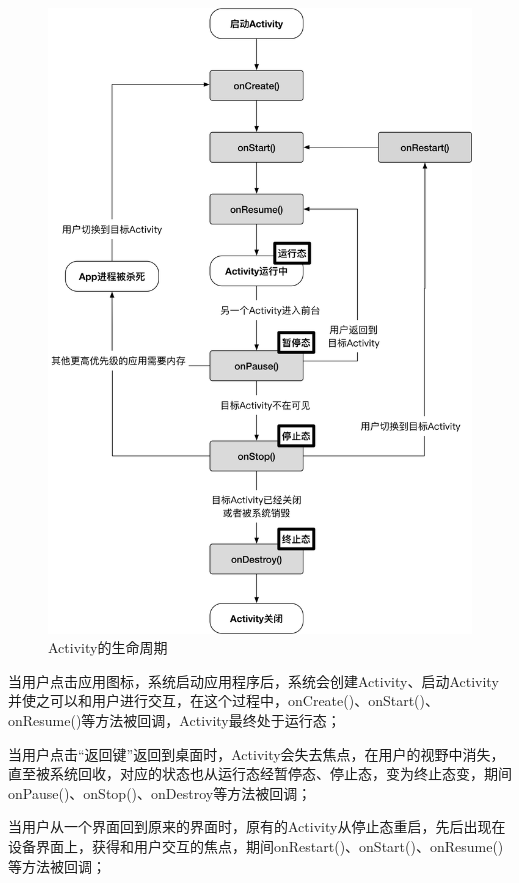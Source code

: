  
\begin{figure}
	\centering
	\includegraphics[width=\textwidth]{./Figures/Activity-lifecycle.png}
	\caption{Activity的生命周期}
	\label{fig:Activity-lifecycle}
\end{figure}


当用户点击应用图标，系统启动应用程序后，系统会创建Activity、启动Activity并使之可以和用户进行交互，在这个过程中，onCreate()、onStart()、onResume()等方法被回调，Activity最终处于运行态；

当用户点击“返回键”返回到桌面时，Activity会失去焦点，在用户的视野中消失，直至被系统回收，对应的状态也从运行态经暂停态、停止态，变为终止态变，期间onPause()、onStop()、onDestroy等方法被回调；

当用户从一个界面回到原来的界面时，原有的Activity从停止态重启，先后出现在设备界面上，获得和用户交互的焦点，期间onRestart()、onStart()、onResume()等方法被回调；

